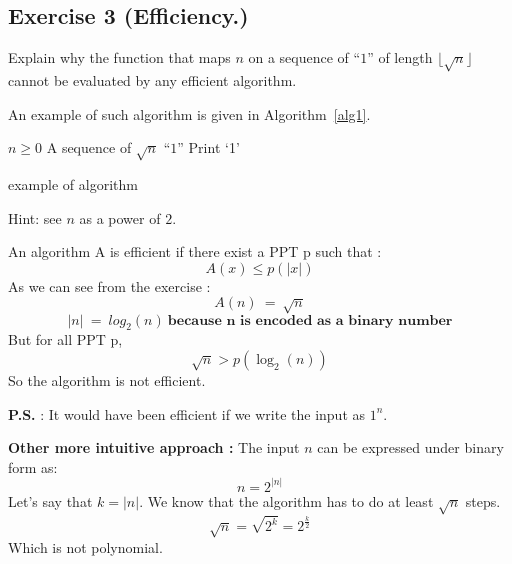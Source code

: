 \subsection{Exercise 3 (Efficiency.)}
Explain why the function that maps $n$ on a sequence of ``$1$'' of length
$\lfloor \sqrt{n}\rfloor$ cannot be evaluated by any efficient algorithm.

An example of such algorithm is given in Algorithm~\ref{alg1}.
\begin{algorithm}                        
\begin{algorithmic}
    \REQUIRE $n \geq 0$
    \ENSURE A sequence of $\sqrt{n}$ ``$1$''
        \STATE Print `1'
    \ENDFOR
\end{algorithmic}    
\caption{example of algorithm}
\label{alg1}      
\end{algorithm}

Hint: see $n$ as a power of $2$.  
\begin{solution}
  An algorithm A is efficient if there exist a PPT p such that : 
  $$ A(x) \leq p(|x|) $$
  As we can see from the exercise : 
  $$A(n) \ = \ \sqrt{n} $$
  $$ |n| \ = \ log_2(n) \ \textbf{because n is encoded as a binary number} $$
  But for all PPT p, 
  \[ \sqrt{n}  >  p(\log_2(n)) \]
  So the algorithm is not efficient. 
  
  \textbf{P.S.} : It would have been efficient if we write the input as $1^n$.
  
  \textbf{Other more intuitive approach : }
  The input $n$ can be expressed under binary form as: $$n = 2^{|n|}$$ 
  Let's say that $k = |n|$. We know that the algorithm has to do at least $\sqrt{n}$ steps.
  $$\sqrt{n} = \sqrt{2^k} = 2^{\frac{k}{2}}$$
  Which is not polynomial.
\end{solution}


